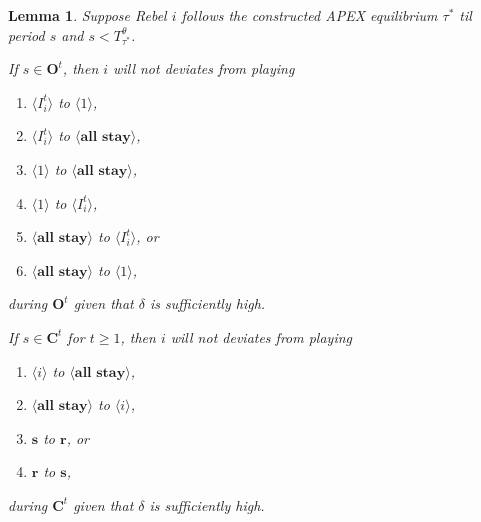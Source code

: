 \documentclass[12pt,letter]{article}
\newcommand{\subscript}[2]{$#1 _ #2$}
\newcommand{\Kappa}{\mathbf{C}}
\newcommand{\Omicron}{\mathbf{O}}
\newtheorem{lemma}{Lemma}[section]
\theoremstyle{definition}
\theoremstyle{remark}
\theoremstyle{claim}
\begin{document}
\begin{lemma} Suppose Rebel $i$ follows the constructed APEX equilibrium $\tau^{*}$ til period $s$ and $s<T^{\theta}_{\tau^{*}}$. 

If $s\in\Omicron^t$, then $i$ will not deviates from playing
\begin{enumerate}[label=(\subscript{o}{{\arabic*}})]
\item $\langle I^{t}_i \rangle$ to $\langle 1 \rangle$,
\item $\langle I^{t}_i \rangle$ to $\langle \textbf{all stay} \rangle$,
\item $\langle 1 \rangle$ to $\langle \textbf{all stay} \rangle$,
\item $\langle 1 \rangle$ to $\langle I^{t}_i \rangle$,
\item $\langle \textbf{all stay} \rangle$ to $\langle I^{t}_i \rangle$, or
\item $\langle \textbf{all stay} \rangle$ to $\langle 1 \rangle$,
\end{enumerate}
during $\Omicron^t$ given that $\delta$ is sufficiently high. 

If $s\in\Kappa^t$ for $t\geq 1$, then $i$ will not deviates from playing
\begin{enumerate}[label=(\subscript{c}{{\arabic*}})]
\item $\langle i \rangle$ to $\langle \textbf{all stay} \rangle$,
\item $\langle \textbf{all stay} \rangle$ to $\langle i \rangle$,
\item $\textbf{s}$ to $\textbf{r}$, or
\item $\textbf{r}$ to $\textbf{s}$,
\end{enumerate}
during $\Kappa^t$ given that $\delta$ is sufficiently high.
\end{lemma}
\end{document}
